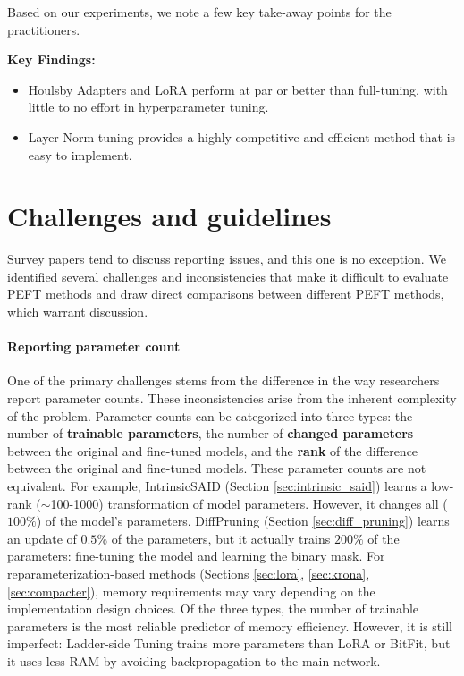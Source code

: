 Based on our experiments, we note a few key take-away points for the practitioners.

\begin{tcolorbox}[
    colback=gray!05,  
    colframe=black!50, boxrule=0.5pt, arc=3mm,           
    width=\linewidth,  
    leftrule=0.1mm, rightrule=0.1mm, bottomrule=0.1mm, toprule=0.1mm, ]
\textbf{Key Findings: }
\begin{itemize}
    \item Houlsby Adapters \citep{adapters} and LoRA \citep{lora} perform at par or better than full-tuning, with little to no effort in hyperparameter tuning. 
    \item Layer Norm \citep{layer_norm_tuning} tuning provides a highly competitive and efficient method that is easy to implement. 
\end{itemize}

\end{tcolorbox}

\section{Challenges and guidelines}

Survey papers tend to discuss reporting issues, and this one is no exception. We identified several challenges and inconsistencies that make it difficult to evaluate PEFT methods and draw direct comparisons between different PEFT methods, which warrant discussion.

\paragraph{Reporting parameter count} One of the primary challenges stems from the difference in the way researchers report parameter counts. These inconsistencies arise from the inherent complexity of the problem. Parameter counts can be categorized into three types: the number of \textbf{trainable parameters}, the number of \textbf{changed parameters} between the original and fine-tuned models, and the \textbf{rank} of the difference between the original and fine-tuned models. These parameter counts are not equivalent. For example, IntrinsicSAID (Section \ref{sec:intrinsic_said}) learns a low-rank ($\sim$100-1000) transformation of model parameters. However, it changes all ($100\%$) of the model's parameters. DiffPruning (Section \ref{sec:diff_pruning}) learns an update of $0.5\%$ of the parameters, but it actually trains $200\%$ of the parameters: fine-tuning the model and learning the binary mask. For reparameterization-based methods (Sections \ref{sec:lora}, \ref{sec:krona}, \ref{sec:compacter}), memory requirements may vary depending on the implementation design choices. Of the three types, the number of trainable parameters is the most reliable predictor of memory efficiency. However, it is still imperfect: Ladder-side Tuning trains more parameters than LoRA or BitFit, but it uses less RAM by avoiding backpropagation to the main network.

